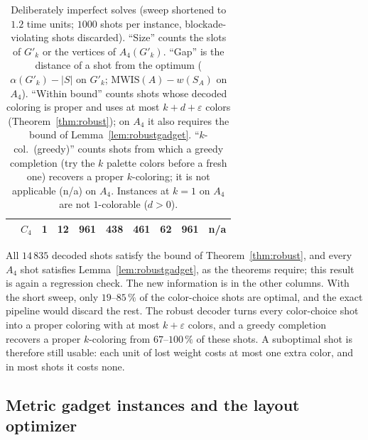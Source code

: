 \documentclass[a4paper,fleqn]{cas-sc}
\newcommand{\MWIS}{\mathrm{MWIS}}
\newcommand{\indep}{\alpha}
\begin{document}
\begin{table}[tb]
\begin{tabular}{@{}llcccccccc@{}}
       & $C_4$          & 1 & 12 & 961  & 438 & 461 & 62  & 961  & n/a \\
\bottomrule
\end{tabular}
\caption{Deliberately imperfect solves (sweep shortened to $1.2$ time units; $1000$
shots per instance, blockade-violating shots discarded). ``Size'' counts the slots of
$G'_k$ or the vertices of $A_4(G'_k)$. ``Gap'' is the distance of a
shot from the optimum ($\indep(G'_k)-|S|$ on $G'_k$; $\MWIS(A)-w(S_A)$ on $A_4$).
``Within bound'' counts shots whose decoded coloring is proper and uses at most
$k+d+\varepsilon$ colors (Theorem~\ref{thm:robust}); on $A_4$ it also requires the
bound of Lemma~\ref{lem:robustgadget}. ``$k$-col.\ (greedy)'' counts shots from which
a greedy completion (try the $k$ palette colors before a fresh one) recovers a proper
$k$-coloring; it is not applicable (n/a) on $A_4$. Instances at $k=1$ on $A_4$ are not
$1$-colorable ($d>0$).}
\label{tab:robust}
\end{table}

All $14\,835$ decoded shots satisfy the bound of Theorem~\ref{thm:robust}, and every
$A_4$ shot satisfies Lemma~\ref{lem:robustgadget}, as the theorems require; this
result is again a regression check. The new information is in the other columns. With
the short sweep, only $19$--$85\,\%$ of the color-choice shots are optimal, and the
exact pipeline would discard the rest. The robust decoder turns every color-choice
shot into a proper coloring with at most $k+\varepsilon$ colors, and a greedy
completion recovers a proper $k$-coloring from $67$--$100\,\%$ of these shots. A suboptimal shot is
therefore still usable: each unit of lost weight costs at most one extra color, and in
most shots it costs none.

\subsection{Metric gadget instances and the layout optimizer}
\label{sec:layouteval}
\end{document}
